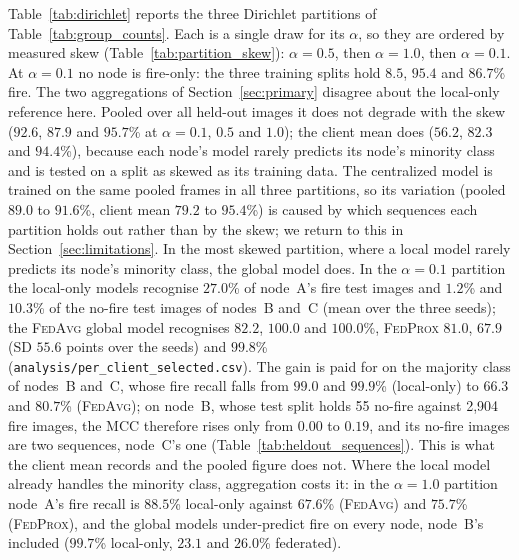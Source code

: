 \documentclass[journal]{IEEEtran}
\newcommand{\fedavg}{\textsc{FedAvg}}
\newcommand{\fedprox}{\textsc{FedProx}}
\begin{document}
Table~\ref{tab:dirichlet} reports the three Dirichlet partitions of Table~\ref{tab:group_counts}. Each is a single draw for its $\alpha$, so they are ordered by measured skew (Table~\ref{tab:partition_skew}): $\alpha=0.5$, then $\alpha=1.0$, then $\alpha=0.1$. At $\alpha=0.1$ no node is fire-only: the three training splits hold $8.5$, $95.4$ and $86.7$\% fire. The two aggregations of Section~\ref{sec:primary} disagree about the local-only reference here. Pooled over all held-out images it does not degrade with the skew ($92.6$, $87.9$ and $95.7$\% at $\alpha=0.1$, $0.5$ and $1.0$); the client mean does ($56.2$, $82.3$ and $94.4$\%), because each node's model rarely predicts its node's minority class and is tested on a split as skewed as its training data. The centralized model is trained on the same pooled frames in all three partitions, so its variation (pooled $89.0$ to $91.6$\%, client mean $79.2$ to $95.4$\%) is caused by which sequences each partition holds out rather than by the skew; we return to this in Section~\ref{sec:limitations}. In the most skewed partition, where a local model rarely predicts its node's minority class, the global model does. In the $\alpha=0.1$ partition the local-only models recognise $27.0$\% of node~A's fire test images and $1.2$\% and $10.3$\% of the no-fire test images of nodes~B and~C (mean over the three seeds); the \fedavg{} global model recognises $82.2$, $100.0$ and $100.0$\%, \fedprox{} $81.0$, $67.9$ (SD $55.6$ points over the seeds) and $99.8$\% (\texttt{analysis/per\_client\_selected.csv}). The gain is paid for on the majority class of nodes~B and~C, whose fire recall falls from $99.0$ and $99.9$\% (local-only) to $66.3$ and $80.7$\% (\fedavg{}); on node~B, whose test split holds 55 no-fire against 2{,}904 fire images, the MCC therefore rises only from $0.00$ to $0.19$, and its no-fire images are two sequences, node~C's one (Table~\ref{tab:heldout_sequences}). This is what the client mean records and the pooled figure does not. Where the local model already handles the minority class, aggregation costs it: in the $\alpha=1.0$ partition node~A's fire recall is $88.5$\% local-only against $67.6$\% (\fedavg{}) and $75.7$\% (\fedprox{}), and the global models under-predict fire on every node, node~B's included ($99.7$\% local-only, $23.1$ and $26.0$\% federated).
\end{document}
